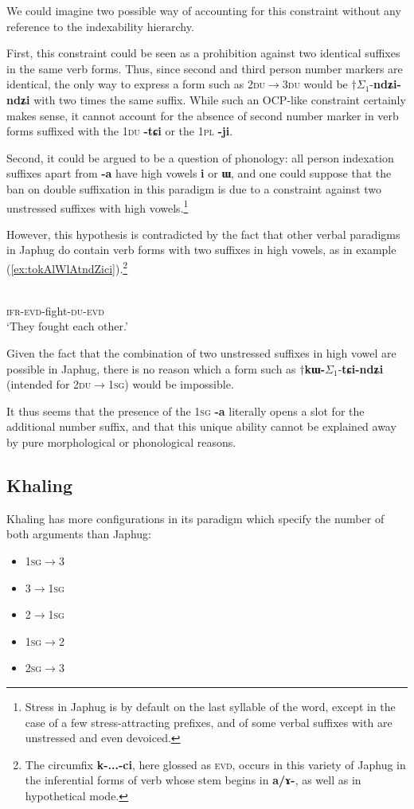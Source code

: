 \documentclass{article}
\newcommand{\ipa}[1]{{\phon\textbf{#1}}}
\newcommand{\siga}{$\Sigma_1$}
\begin{document}
We could imagine two possible way of accounting for this constraint without any reference to the indexability hierarchy.

First, this constraint could be seen as a prohibition against two identical suffixes in the same verb forms. Thus, since second and third person number markers are identical, the only way to express a form such as \textsc{2du$\rightarrow$3du} would be $\dagger$\siga{}-\ipa{ndʑi-ndʑi} with two times the same suffix. While such an OCP-like constraint certainly makes sense, it cannot account for the absence of second number marker in verb forms suffixed with the \textsc{1du} \ipa{-tɕi} or the \textsc{1pl} \ipa{-ji}.

Second, it could be argued to be a question of phonology: all person indexation suffixes apart from \ipa{-a} have high vowels \ipa{i} or \ipa{ɯ}, and one could suppose that the ban on double suffixation in this paradigm is due to a constraint against two unstressed suffixes with high vowels.\footnote{Stress in Japhug is by default on the last syllable of the word, except in the case of a few stress-attracting prefixes, and of some verbal suffixes with are unstressed and even devoiced.}

However, this hypothesis is contradicted by the fact that other verbal paradigms in Japhug do contain verb forms with two suffixes in high vowels, as in example (\ref{ex:tokAlWlAtndZici}).\footnote{The circumfix \ipa{k-...-ci}, here glossed as \textsc{evd}, occurs in this variety of Japhug in the inferential forms of verb whose stem begins in \ipa{a/ɤ-}, as well as in hypothetical mode. }

\begin{exe}
\ex \label{ex:tokAlWlAtndZici}
\gll \ipa{to-k-ɤlɯlɤt-ndʑi-ci} \\
\textsc{ifr-evd}-fight-\textsc{du-evd} \\
\glt `They fought each other.'
\end{exe}

Given the fact that the combination of two unstressed suffixes in high vowel are possible in Japhug, there is no reason which a form such as $\dagger$\ipa{kɯ-}\siga{}-\ipa{tɕi-ndʑi} (intended for \textsc{2du$\rightarrow$1sg}) would be impossible.

It thus seems that the presence of the \textsc{1sg} \ipa{-a} literally opens a slot for the additional number suffix, and that this unique ability cannot be explained away by pure morphological or phonological reasons. 

\subsection{Khaling}
Khaling has more configurations in its paradigm which specify the number of both arguments than Japhug:
\begin{itemize}
\item  \textsc{1sg}$\rightarrow$3
\item 3$\rightarrow$\textsc{1sg} 
\item 2$\rightarrow$\textsc{1sg}
\item \textsc{1sg}$\rightarrow$2
\item \textsc{2sg}$\rightarrow$3
\end{itemize}
\end{document}
